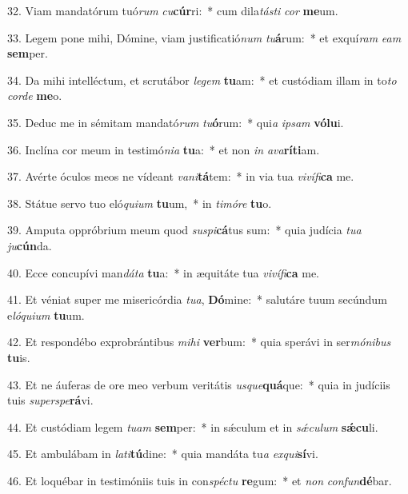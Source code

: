 32. Viam mandatórum tuó\textit{rum} \textit{cu}\textbf{cúr}ri:~*  cum dila\textit{tás}\textit{ti} \textit{cor} \textbf{me}um.\

33. Legem pone mihi, Dómine, viam justificatió\textit{num} \textit{tu}\textbf{á}rum:~*  et exquí\textit{ram} \textit{e}\textit{am} \textbf{sem}per.\

34. Da mihi intelléctum, et scrutábor \textit{le}\textit{gem} \textbf{tu}am:~*  et custódiam illam in to\textit{to} \textit{cor}\textit{de} \textbf{me}o.\

35. Deduc me in sémitam mandató\textit{rum} \textit{tu}\textbf{ó}rum:~*  qui\textit{a} \textit{ip}\textit{sam} \textbf{vó}\textbf{lu}i.\

36. Inclína cor meum in testimó\textit{ni}\textit{a} \textbf{tu}a:~*  et non \textit{in} \textit{a}\textit{va}\textbf{rí}\textbf{ti}am.\

37. Avérte óculos meos ne vídeant \textit{va}\textit{ni}\textbf{tá}tem:~*  in via tua \textit{vi}\textit{ví}\textit{fi}\textbf{ca} me.\

38. Státue servo tuo eló\textit{qui}\textit{um} \textbf{tu}um,~*  in \textit{ti}\textit{mó}\textit{re} \textbf{tu}o.\

39. Amputa oppróbrium meum quod \textit{su}\textit{spi}\textbf{cá}tus sum:~*  quia judícia \textit{tu}\textit{a} \textit{ju}\textbf{cún}da.\

40. Ecce concupívi man\textit{dá}\textit{ta} \textbf{tu}a:~*  in æquitáte tua \textit{vi}\textit{ví}\textit{fi}\textbf{ca} me.\

41. Et véniat super me misericórdia \textit{tu}\textit{a}, \textbf{Dó}mine:~*  salutáre tuum secúndum e\textit{ló}\textit{qui}\textit{um} \textbf{tu}um.\

42. Et respondébo exprobrántibus \textit{mi}\textit{hi} \textbf{ver}bum:~*  quia sperávi in ser\textit{mó}\textit{ni}\textit{bus} \textbf{tu}is.\

43. Et ne áuferas de ore meo verbum veritátis \textit{us}\textit{que}\textbf{quá}que:~*  quia in judíciis tuis \textit{su}\textit{per}\textit{spe}\textbf{rá}vi.\

44. Et custódiam legem \textit{tu}\textit{am} \textbf{sem}per:~*  in sǽculum et in \textit{sǽ}\textit{cu}\textit{lum} \textbf{sǽ}\textbf{cu}li.\

45. Et ambulábam in \textit{la}\textit{ti}\textbf{tú}dine:~*  quia mandáta tu\textit{a} \textit{ex}\textit{qui}\textbf{sí}vi.\

46. Et loquébar in testimóniis tuis in con\textit{spéc}\textit{tu} \textbf{re}gum:~*  et \textit{non} \textit{con}\textit{fun}\textbf{dé}bar.\

